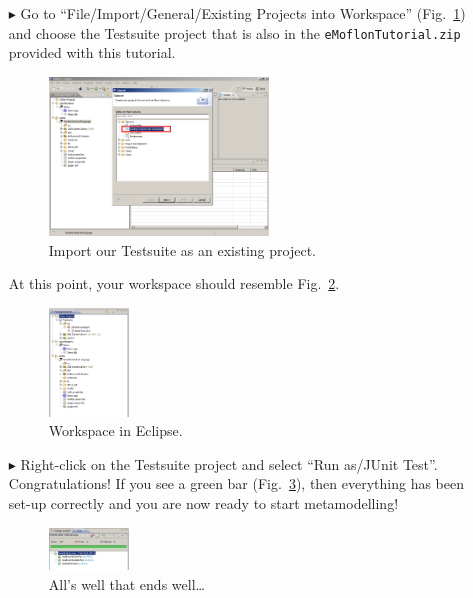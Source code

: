 \begin{enumerate}
\item[$\blacktriangleright$] Go to ``File/Import/General/Existing Projects
into Workspace'' (Fig.~\ref{fig_eclipseTestsuiteImport}) and choose the
Testsuite project that is also in the \texttt{eMoflonTutorial.zip} provided
with this tutorial. 
\begin{figure}[!h]
	\centering
  \includegraphics[width=0.55\textwidth]{pics/installationAndSetup/eclipse_testsuitimport.png}
	\caption{Import our Testsuite as an existing project.}
	\label{fig_eclipseTestsuiteImport}
\end{figure}

\newpage 

\item[] At this point, your workspace should resemble
Fig.~\ref{fig_eclipsepackageexplorer}.
\begin{figure}[!h]
	\centering
  \includegraphics[width=0.2\textwidth]{pics/installationAndSetup/eclipse_packageexplorer.png}
	\caption{Workspace in Eclipse.}
	\label{fig_eclipsepackageexplorer}
\end{figure}

\item[$\blacktriangleright$] Right-click on the Testsuite project and select
``Run as/JUnit Test''.
Congratulations!  If you see a green bar  (Fig.~\ref{fig_eclipsetestsuiterun}),
then everything has been set-up correctly and you are now ready to start
metamodelling!
\begin{figure}[!h]
	\centering
  \includegraphics[width=0.2\textwidth]{pics/installationAndSetup/eclipse_testsuiterun.png}
	\caption{All's well that ends well\ldots}
	\label{fig_eclipsetestsuiterun}
\end{figure}
\end{enumerate}



